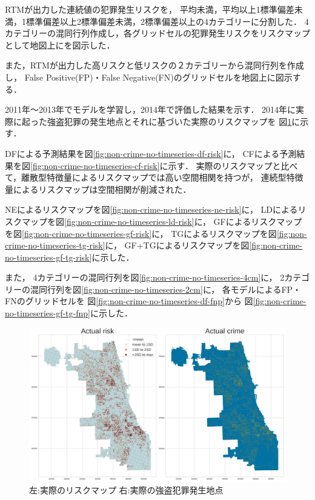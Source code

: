 RTMが出力した連続値の犯罪発生リスクを，
平均未満，平均以上1標準偏差未満，1標準偏差以上2標準偏差未満，2標準偏差以上の4カテゴリーに分割した．
4カテゴリーの混同行列作成し，各グリッドセルの犯罪発生リスクをリスクマップとして地図上にを図示した．

また，RTMが出力した高リスクと低リスクの２カテゴリーから混同行列を作成し，
False Positive(FP)・False Negative(FN)のグリッドセルを地図上に図示する．

2011年〜2013年でモデルを学習し，2014年で評価した結果を示す．
2014年に実際に起った強盗犯罪の発生地点とそれに基づいた実際のリスクマップを
図\ref{fig:non-crime-no-timeseries-actual-risk}に示す．

DFによる予測結果を図\ref{fig:non-crime-no-timeseries-df-risk}に，
CFによる予測結果を図\ref{fig:non-crime-no-timeseries-cf-risk}に示す．
実際のリスクマップと比べて，離散型特徴量によるリスクマップでは高い空間相関を持つが，
連続型特徴量によるリスクマップは空間相関が削減された．

NEによるリスクマップを図\ref{fig:non-crime-no-timeseries-ne-risk}に，
LDによるリスクマップを図\ref{fig:non-crime-no-timeseries-ld-risk}に，
GFによるリスクマップを図\ref{fig:non-crime-no-timeseries-gf-risk}に，
TGによるリスクマップを図\ref{fig:non-crime-no-timeseries-tg-risk}に，
GF+TGによるリスクマップを図\ref{fig:non-crime-no-timeseries-gf-tg-risk}に示した．


また，
4カテゴリーの混同行列を図\ref{fig:non-crime-no-timeseries-4cm}に，
2カテゴリーの混同行列を図\ref{fig:non-crime-no-timeseries-2cm}に，
各モデルによるFP・FNのグリッドセルを
図\ref{fig:non-crime-no-timeseries-df-fnp}から
図\ref{fig:non-crime-no-timeseries-gf-tg-fnp}に示した．

\begin{figure}
  \centering %
  \includegraphics[scale=0.25]{./non-crime-no-timeseries-fig/actual_risk_point_map.png}
  \caption{左:実際のリスクマップ 右:実際の強盗犯罪発生地点}
  \label{fig:non-crime-no-timeseries-actual-risk}
\end{figure}

